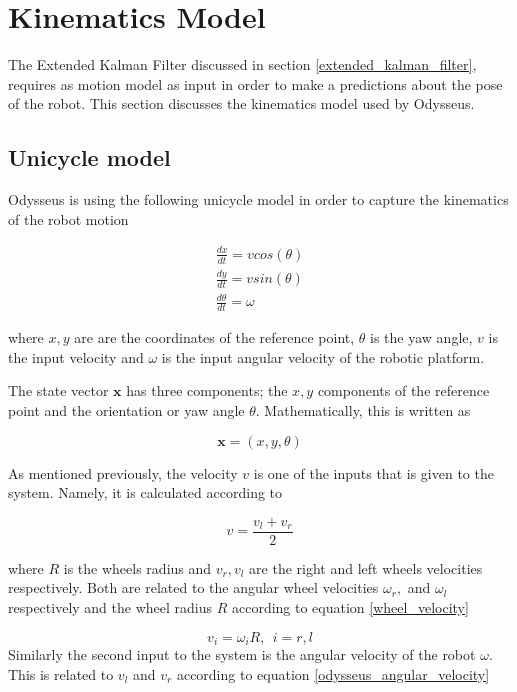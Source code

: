 \section{Kinematics Model}
\label{modeling}
The Extended Kalman Filter discussed in section \ref{extended_kalman_filter}, requires
as motion model as input in order to make a predictions about the
pose of the robot. This section discusses the kinematics model used by Odysseus.

\subsection{Unicycle model}
\label{unicycle_model}

Odysseus is using the following unicycle model in order to capture the kinematics
of the robot motion 

\begin{eqnarray}
\frac{dx}{dt} = v cos(\theta) \\
\frac{dy}{dt} = v sin(\theta) \\
\frac{d\theta}{dt} = \omega
\label{continuous_kinematic_model} 
\end{eqnarray}

where $x,y$ are are the coordinates of the reference point, $\theta$ is the yaw angle, $v$ is the input velocity and $\omega$ is the input angular velocity of the robotic platform.

The state vector $\mathbf{x}$ has three components; the $x, y$ components of the 
reference point and the orientation or yaw angle $\theta$. Mathematically, this is written as

\begin{equation}
\mathbf{x} = (x, y, \theta)
\label{state_vector}
\end{equation}

As mentioned previously, the velocity $v$ is one of the inputs that is given to the system. Namely, it is calculated according to

\begin{equation}
v = \frac{v_l + v_r}{2}
\label{odysseus_velocity}
\end{equation}

where $R$ is the wheels radius and $v_r,v_l$ are the right and left wheels velocities respectively. Both are related to the angular wheel velocities $\omega_r,$ and  $\omega_l$ respectively and the wheel radius $R$ according to equation \ref{wheel_velocity}

\begin{equation}
v_i = \omega_iR, ~~ i = r, l
\label{wheel_velocity}
\end{equation}
Similarly the second input to the system is the angular velocity of 
the robot $\omega$. This is related to $v_l$ and $v_r$ according to equation \ref{odysseus_angular_velocity}

